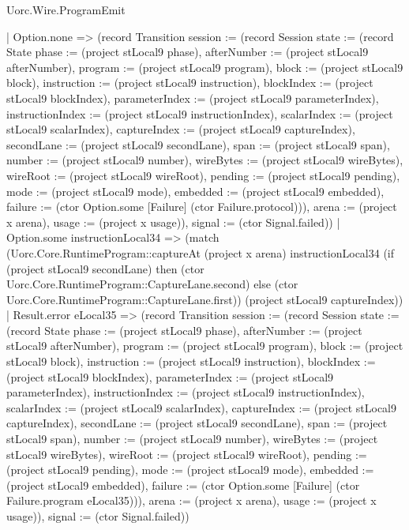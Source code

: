 \begin{lexlean}{Uorc.Wire.ProgramEmit}
\begin{semanticmodule}
{          | Option.none => (record Transition {session := (record Session {state := (record State {phase := (project stLocal9 phase), afterNumber := (project stLocal9 afterNumber), program := (project stLocal9 program), block := (project stLocal9 block), instruction := (project stLocal9 instruction), blockIndex := (project stLocal9 blockIndex), parameterIndex := (project stLocal9 parameterIndex), instructionIndex := (project stLocal9 instructionIndex), scalarIndex := (project stLocal9 scalarIndex), captureIndex := (project stLocal9 captureIndex), secondLane := (project stLocal9 secondLane), span := (project stLocal9 span), number := (project stLocal9 number), wireBytes := (project stLocal9 wireBytes), wireRoot := (project stLocal9 wireRoot), pending := (project stLocal9 pending), mode := (project stLocal9 mode), embedded := (project stLocal9 embedded), failure := (ctor Option.some [Failure] (ctor Failure.protocol))}), arena := (project x arena), usage := (project x usage)}), signal := (ctor Signal.failed)})
          | Option.some instructionLocal34 => (match (Uorc.Core.RuntimeProgram::captureAt (project x arena) instructionLocal34 (if (project stLocal9 secondLane) then (ctor Uorc.Core.RuntimeProgram::CaptureLane.second) else (ctor Uorc.Core.RuntimeProgram::CaptureLane.first)) (project stLocal9 captureIndex))
            | Result.error eLocal35 => (record Transition {session := (record Session {state := (record State {phase := (project stLocal9 phase), afterNumber := (project stLocal9 afterNumber), program := (project stLocal9 program), block := (project stLocal9 block), instruction := (project stLocal9 instruction), blockIndex := (project stLocal9 blockIndex), parameterIndex := (project stLocal9 parameterIndex), instructionIndex := (project stLocal9 instructionIndex), scalarIndex := (project stLocal9 scalarIndex), captureIndex := (project stLocal9 captureIndex), secondLane := (project stLocal9 secondLane), span := (project stLocal9 span), number := (project stLocal9 number), wireBytes := (project stLocal9 wireBytes), wireRoot := (project stLocal9 wireRoot), pending := (project stLocal9 pending), mode := (project stLocal9 mode), embedded := (project stLocal9 embedded), failure := (ctor Option.some [Failure] (ctor Failure.program eLocal35))}), arena := (project x arena), usage := (project x usage)}), signal := (ctor Signal.failed)})
}
\end{semanticmodule}
\end{lexlean}
